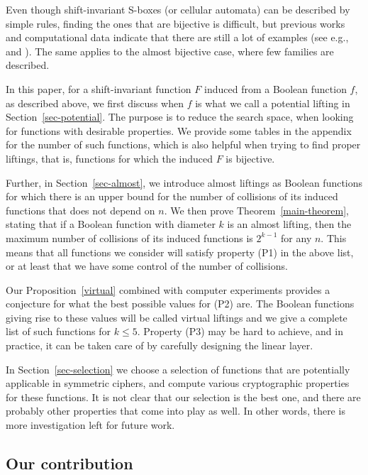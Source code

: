 \documentclass[11pt,english,a4paper]{amsart}
\theoremstyle{plain}
\theoremstyle{definition}
\theoremstyle{remark}
\begin{document}
	Even though shift-invariant S-boxes (or cellular automata) can be described by simple rules, finding the ones that are bijective is difficult, but previous works and computational data indicate that there are still a lot of examples (see e.g., \cite[Appendix~A]{JDA-thesis} and \cite{OS-iacr}). The same applies to the almost bijective case, where few families are described.
	
	In this paper, for a shift-invariant function $F$ induced from a Boolean function $f$, as described above, we first discuss when $f$ is what we call a potential lifting in Section~\ref{sec-potential}. The purpose is to reduce the search space, when looking for functions with desirable properties. We provide some tables in the appendix for the number of such functions, which is also helpful when trying to find proper liftings, that is, functions for which the induced $F$ is bijective.
	
	Further, in Section~\ref{sec-almost}, we introduce almost liftings as Boolean functions for which there is an upper bound for the number of collisions of its induced functions that does not depend on $n$. We then prove Theorem~\ref{main-theorem}, stating that if a Boolean function with diameter $k$ is an almost lifting, then the maximum number of collisions of its induced functions is $2^{k-1}$ for any $n$. This means that all functions we consider will satisfy property (P1) in the above list, or at least that we have some control of the number of collisions.
	
	Our Proposition~\ref{virtual} combined with computer experiments provides a conjecture for what the best possible values for (P2) are. The Boolean functions giving rise to these values will be called virtual liftings and we give a complete list of such functions for $k\leq 5$. Property (P3) may be hard to achieve, and in practice, it can be taken care of by carefully designing the linear layer.
	
	In Section~\ref{sec-selection} we choose a selection of functions that are potentially applicable in symmetric ciphers, and compute various cryptographic properties for these functions. It is not clear that our selection is the best one, and there are probably other properties that come into play as well. In other words, there is more investigation left for future work.

    \subsection*{Our contribution}
\end{document}
